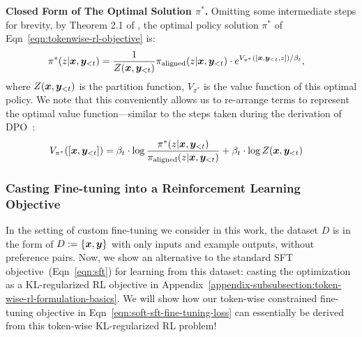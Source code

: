 \textbf{Closed Form of The Optimal Solution $\pi^*$.} Omitting some intermediate steps for brevity, by Theorem 2.1 of \citet{mudgal2024controlled}, the optimal policy solution $\pi^*$ of Eqn~\ref{eqn:tokenwise-rl-objective} is:
\begin{align}
    & \pi^*(z | \bm{x}, \bm{y}_{< t}) = \frac{1}{Z(\bm{x}, \bm{y}_{<t})}  \pi_{\mathrm{aligned}} (z | \bm{x}, \bm{y}_{<t}) \cdot e^{V_{\pi^*}([\bm{x}, \bm{y}_{<t}, z]) / \beta_t},
\end{align}
where $Z(\bm{x}, \bm{y}_{<t})$ is the partition function, $V_{\pi^*}$ is the value function of this optimal policy. We note that this conveniently allows us to re-arrange terms to represent the optimal value function---similar to the steps taken during the derivation of DPO~\cite{rafailov2023direct}:
\begin{align}
    & V_{\pi^*}([\bm{x}, \bm{y}_{<t}]) = \beta_t \cdot \log \frac{\pi^*(z|\bm{x}, \bm{y}_{<t})}{\pi_{\mathrm{aligned}}(z|\bm{x}, \bm{y}_{<t})} + \beta_t \cdot \log Z(\bm{x}, \bm{y}_{<t})
\label{eqn:token-wise-optimal-solution}
\end{align}




\subsubsection{Casting Fine-tuning into a Reinforcement Learning Objective}
\label{appendix-subsubsec:cast-custom-fine-tuning-to-RL}

In the setting of custom fine-tuning we consider in this work, the dataset $D$ is in the form of $D := \{\bm{x}, \bm{y}\}$ with only inputs and example outputs, without preference pairs. 
Now, we show an alternative to the standard SFT objective~(Eqn~\ref{eqn:sft}) for learning from this dataset: casting the optimization as a KL-regularized RL objective in Appendix~\ref{appendix-subsubsection:token-wise-rl-formulation-basics}. 
We will show how our token-wise constrained fine-tuning objective in Eqn~\ref{eqn:soft-sft-fine-tuning-loss} can essentially be derived from this token-wise KL-regularized RL problem!

